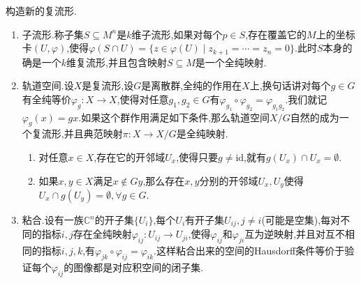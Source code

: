 构造新的复流形.
\begin{enumerate}
	\item 子流形.称子集$S\subseteq M^n$是$k$维子流形,如果对每个$p\in S$,存在覆盖它的$M$上的坐标卡$(U,\varphi)$,使得$\varphi(S\cap U)=\{z\in\varphi(U)\mid z_{k+1}=\cdots=z_n=0\}$.此时$S$本身的确是一个$k$维复流形,并且包含映射$S\subseteq M$是一个全纯映射.
	\item 轨道空间.设$X$是复流形,设$G$是离散群,全纯的作用在$X$上,换句话讲对每个$g\in G$有全纯等价$\varphi_g:X\to X$,使得对任意$g_1,g_2\in G$有$\varphi_{g_1}\circ\varphi_{g_2}=\varphi_{g_1g_2}$.我们就记$\varphi_g(x)=gx$.如果这个群作用满足如下条件,那么轨道空间$X/G$自然的成为一个复流形,并且典范映射$\pi:X\to X/G$是全纯映射.
	\begin{enumerate}
		\item 对任意$x\in X$,存在它的开邻域$U_x$,使得只要$g\not=\mathrm{id}$,就有$g(U_x)\cap U_x=\emptyset$.
		\item 如果$x,y\in X$满足$x\not\in Gy$,那么存在$x,y$分别的开邻域$U_x,U_y$使得$U_x\cap g(U_y)=\emptyset,\forall g\in G$.
	\end{enumerate}
    \item 粘合.设有一族$\mathbb{C}^n$的开子集$\{U_i\}$,每个$U_i$有开子集$U_{ij},j\not=i$(可能是空集),每对不同的指标$i,j$存在全纯映射$\varphi_{ij}:U_{ij}\to U_{ji}$,使得$\varphi_{ij}$和$\varphi_{ji}$互为逆映射,并且对互不相同的指标$i,j,k$,有$\varphi_{jk}\circ\varphi_{ij}=\varphi_{ik}$.这样粘合出来的空间的Hausdorff条件等价于验证每个$\varphi_{ij}$的图像都是对应积空间的闭子集.
\end{enumerate}

